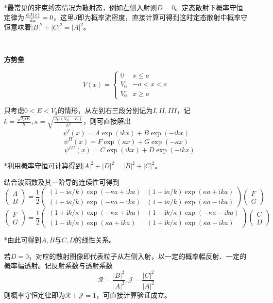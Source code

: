 \documentclass[a4paper,UTF8,fontset=windows]{ctexart}
\newcommand*{\dr}{\hspace{0.07em}\mathrm{d}}
\newcommand*{\ir}{\mathrm{i}}
\begin{document}
*最常见的非束缚态情况为散射态，例如左侧入射则$D=0$。定态散射下概率守恒定律为$\frac{\dr J(x)}{\dr x}=0$，这里$J$即为概率流密度，直接计算可得到这时定态散射中概率守恒意味着$|B|^2+|C|^2=|A|^2$。

\

\textbf{方势垒}

$$V(x)=\begin{cases}0&x\le a\\V_0&-a<x<a\\V_0&x\ge a\end{cases}$$

只考虑$0<E<V_0$的情形，从左到右三段分别记为$I,II,III$，记$k=\frac{\sqrt{2\mu E}}{\hbar},\kappa=\sqrt{\frac{2\mu(V_0-E)}{\hbar^2}}$，则可直接解出
$$\psi^I(x)=A\exp(\ir kx)+B\exp(-\ir kx)$$
$$\psi^{II}(x)=F\exp(\kappa x)+G\exp(-\kappa x)$$
$$\quad\psi^{III}(x)=C\exp(\ir kx)+D\exp(-\ir kx)$$

*利用概率守恒可计算得到$|A|^2+|D|^2=|B|^2+|C|^2$。

结合波函数及其一阶导的连续性可得到
$$\begin{pmatrix}A\\B\end{pmatrix}=\frac{1}{2}\begin{pmatrix}(1-\ir\kappa/k)\exp(-\kappa a+\ir ka)&(1+\ir\kappa/k)\exp(\kappa a+\ir ka)\\(1+\ir\kappa/k)\exp(-\kappa a-\ir ka)&(1-\ir\kappa/k)\exp(\kappa a-\ir ka)\end{pmatrix}\begin{pmatrix}F\\G\end{pmatrix}$$
$$\begin{pmatrix}F\\G\end{pmatrix}=\frac{1}{2}\begin{pmatrix}(1+\ir k/\kappa)\exp(-\kappa a+\ir ka)&(1-\ir k/\kappa)\exp(-\kappa a-\ir ka)\\(1-\ir k/\kappa)\exp(\kappa a+\ir ka)&(1+\ir k/\kappa)\exp(\kappa a-\ir ka)\end{pmatrix}\begin{pmatrix}C\\D\end{pmatrix}$$

*由此可得到$A,B$与$C,D$的线性关系。

若$D=0$，对应的散射图像即代表粒子从左侧入射，以一定的概率幅反射、一定的概率幅透射。记反射系数与透射系数
$$\mathcal{R}=\frac{|B|^2}{|A|^2},\mathcal{J}=\frac{|C|^2}{|A|^2}$$
则概率守恒定律即为$\mathcal{R}+\mathcal{J}=1$，可直接计算验证成立。
\end{document}

